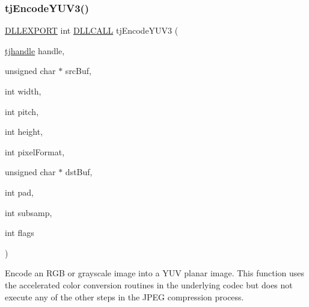 \mbox{\label{group___turbo_j_p_e_g_ga0a5ffbf7cb58a5b6a8201114fe889360}} 
\subsubsection{\texorpdfstring{tj\+Encode\+Y\+U\+V3()}{tjEncodeYUV3()}}
{\footnotesize\ttfamily \hyperlink{turbojpeg_8h_a808e08638be3cba36e36759e5b150de0}{D\+L\+L\+E\+X\+P\+O\+RT} int \hyperlink{turbojpeg_8h_a54b25836118bfac94a53a7b790f3ccb2}{D\+L\+L\+C\+A\+LL} tj\+Encode\+Y\+U\+V3 (\begin{DoxyParamCaption}\item[{\hyperlink{group___turbo_j_p_e_g_ga758d2634ecb4949de7815cba621f5763}{tjhandle}}]{handle,  }\item[{unsigned char $\ast$}]{src\+Buf,  }\item[{int}]{width,  }\item[{int}]{pitch,  }\item[{int}]{height,  }\item[{int}]{pixel\+Format,  }\item[{unsigned char $\ast$}]{dst\+Buf,  }\item[{int}]{pad,  }\item[{int}]{subsamp,  }\item[{int}]{flags }\end{DoxyParamCaption})}

Encode an R\+GB or grayscale image into a Y\+UV planar image. This function uses the accelerated color conversion routines in the underlying codec but does not execute any of the other steps in the J\+P\+EG compression process.



